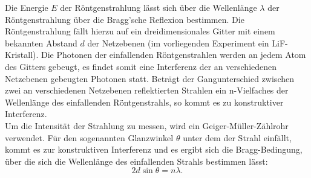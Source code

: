Die Energie $E$ der Röntgenstrahlung lässt sich über die Wellenlänge $\lambda$ der Röntgenstrahlung über die Bragg'sche Reflexion bestimmen.
Die Röntgenstrahlung fällt hierzu auf ein dreidimensionales Gitter mit einem bekannten Abstand $d$ der Netzebenen (im vorliegenden Experiment ein LiF-Kristall). Die Photonen der einfallenden Röntgenstrahlen werden an jedem Atom des Gitters gebeugt, es findet somit eine Interferenz der an verschiedenen Netzebenen gebeugten Photonen statt.
Beträgt der Gangunterschied zwischen zwei an verschiedenen Netzebenen reflektierten Strahlen ein n-Vielfaches der Wellenlänge des einfallenden Röntgenstrahls, so kommt es zu konstruktiver Interferenz.\\
Um die Intensität der Strahlung zu messen, wird ein Geiger-Müller-Zählrohr verwendet.
Für den sogenannten Glanzwinkel $\theta$ unter dem der Strahl einfällt, kommt es zur konstruktiven Interferenz und es ergibt sich die Bragg-Bedingung, über die sich die Wellenlänge des einfallenden Strahls bestimmen lässt:
\begin{equation}
	\label{eqn:braggii}
  2d \sin{\theta}=n\lambda \text{.}
\end{equation}
